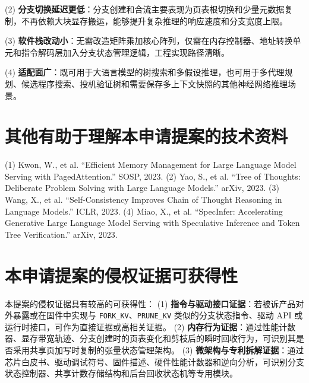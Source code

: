 \documentclass[12pt,a4paper]{article}
\begin{document}
(2) \textbf{分支切换延迟更低}：分支创建和合流主要表现为页表根切换和少量元数据复制，不再依赖大块显存搬运，能够提升复杂推理的响应速度和分支宽度上限。

(3) \textbf{软件栈改动小}：无需改造矩阵乘加核心阵列，仅需在内存控制器、地址转换单元和指令解码层加入分支状态管理逻辑，工程实现路径清晰。

(4) \textbf{适配面广}：既可用于大语言模型的树搜索和多假设推理，也可用于多代理规划、候选程序搜索、投机验证树和需要保存多上下文快照的其他神经网络推理场景。

\section{其他有助于理解本申请提案的技术资料}

(1) Kwon, W., et al. ``Efficient Memory Management for Large Language Model Serving with PagedAttention.'' SOSP, 2023.
(2) Yao, S., et al. ``Tree of Thoughts: Deliberate Problem Solving with Large Language Models.'' arXiv, 2023.
(3) Wang, X., et al. ``Self-Consistency Improves Chain of Thought Reasoning in Language Models.'' ICLR, 2023.
(4) Miao, X., et al. ``SpecInfer: Accelerating Generative Large Language Model Serving with Speculative Inference and Token Tree Verification.'' arXiv, 2023.

\section{本申请提案的侵权证据可获得性}

本提案的侵权证据具有较高的可获得性：
(1) \textbf{指令与驱动接口证据}：若被诉产品对外暴露或在固件中实现与 \texttt{FORK\_KV}、\texttt{PRUNE\_KV} 类似的分支状态指令、驱动 API 或运行时接口，可作为直接证据或高相关证据。
(2) \textbf{内存行为证据}：通过性能计数器、显存带宽轨迹、分支创建时的页表变化和剪枝后的瞬时回收行为，可识别其是否采用共享页加写时复制的张量状态管理架构。
(3) \textbf{微架构与专利拆解证据}：通过芯片白皮书、驱动调试符号、固件描述、硬件性能计数器和逆向分析，可识别分支状态控制器、共享计数存储结构和后台回收状态机等专用模块。
\end{document}
